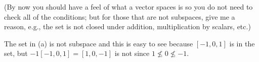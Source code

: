 \begin{questions}
  (By now you should have a feel of what a vector spaces is so you do not
  need to check all of the conditions; but for those that are not
  subspaces, give me a reason, e.g., the set is not closed under addition,
  multiplication by scalars, etc.)
  \begin{solution}
    The set in (a) is not subspace and this is easy to see because
    $[-1,0,1]$ is in the set, but $-1[-1,0,1]=[1,0,-1]$ is not since
    $1\nleq 0\nleq -1$.


\end{solution}
\end{questions}
